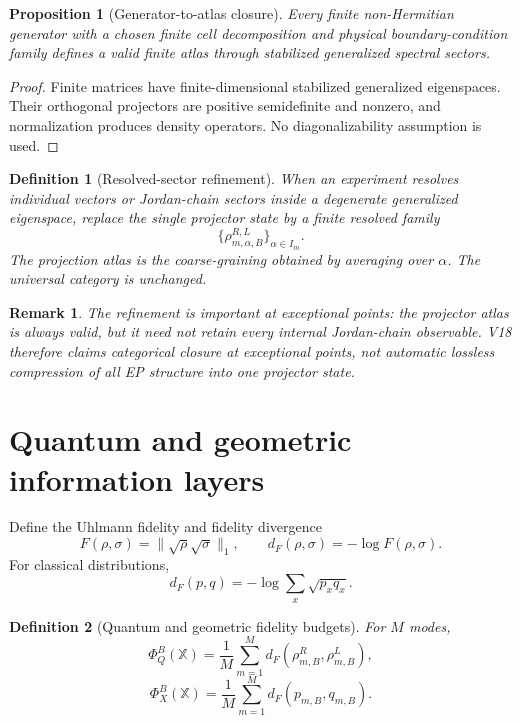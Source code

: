 \documentclass[11pt]{article}
\newtheorem{definition}{Definition}
\newtheorem{proposition}{Proposition}
\newtheorem{remark}{Remark}
\begin{document}
\begin{proposition}[Generator-to-atlas closure]
Every finite non-Hermitian generator with a chosen finite cell decomposition and physical boundary-condition family defines a valid finite atlas through stabilized generalized spectral sectors.
\end{proposition}

\begin{proof}
Finite matrices have finite-dimensional stabilized generalized eigenspaces. Their orthogonal projectors are positive semidefinite and nonzero, and normalization produces density operators. No diagonalizability assumption is used.
\end{proof}

\begin{definition}[Resolved-sector refinement]
When an experiment resolves individual vectors or Jordan-chain sectors inside a degenerate generalized eigenspace, replace the single projector state by a finite resolved family
\[
\{\rho_{m,\alpha,B}^{R,L}\}_{\alpha\in I_m}.
\]
The projection atlas is the coarse-graining obtained by averaging over \(\alpha\). The universal category is unchanged.
\end{definition}

\begin{remark}
The refinement is important at exceptional points: the projector atlas is always valid, but it need not retain every internal Jordan-chain observable. V18 therefore claims categorical closure at exceptional points, not automatic lossless compression of all EP structure into one projector state.
\end{remark}

\section{Quantum and geometric information layers}

Define the Uhlmann fidelity and fidelity divergence
\[
F(\rho,\sigma)=\|\sqrt\rho\sqrt\sigma\|_1,
\qquad
 d_F(\rho,\sigma)=-\log F(\rho,\sigma).
\]
For classical distributions,
\[
 d_F(p,q)=-\log\sum_x\sqrt{p_xq_x}.
\]

\begin{definition}[Quantum and geometric fidelity budgets]
For \(M\) modes,
\[
\Phi_Q^B(\mathbb X)
=
\frac1M\sum_{m=1}^{M}
 d_F(\rho_{m,B}^R,\rho_{m,B}^L),
\]
\[
\Phi_X^B(\mathbb X)
=
\frac1M\sum_{m=1}^{M}
 d_F(p_{m,B},q_{m,B}).
\]
\end{definition}
\end{document}
